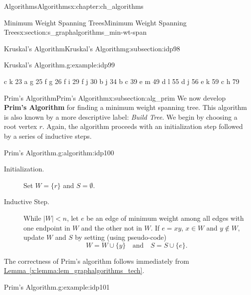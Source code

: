 \documentclass[oneside,10pt,]{book}
\newcommand{\xreffont}{\relax}
\newcommand{\terminology}[1]{\textbf{#1}}
\numberwithin{equation}{section}
\newcommand{\lt}{<}
\begin{document}
\begin{chapterptx}{Algorithms}{}{Algorithms}{}{}{x:chapter:ch_algorithms}
\begin{sectionptx}{Minimum Weight Spanning Trees}{}{Minimum Weight Spanning Trees}{}{}{x:section:s_graphalgorithms_min-wt-span}
\begin{subsectionptx}{Kruskal's Algorithm}{}{Kruskal's Algorithm}{}{}{g:subsection:idp98}
\begin{example}{Kruskal's Algorithm.}{g:example:idp99}
\begin{sidebyside}{2}{0.0125}{0.0125}{0.025}
\begin{sbspanel}{0.78}
\end{sbspanel}%
\begin{sbspanel}{0.17}%
\begin{preformatted}
c k 23
a g 25
f g 26
f i 29
f j 30
b j 34
b c 39
e m 49
d l 55
d j 56
e k 59
c h 79
\end{preformatted}
\end{sbspanel}%
\end{sidebyside}%
\end{example}
\end{subsectionptx}
%
%
\typeout{************************************************}
\typeout{************************************************}
%
\begin{subsectionptx}{Prim's Algorithm}{}{Prim's Algorithm}{}{}{x:subsection:alg_prim}
We now develop \terminology{Prim's Algorithm} for finding a minimum weight spanning tree. This algorithm is also known by a more descriptive label: \emph{Build Tree}. We begin by choosing a root vertex \(r\). Again, the algorithm proceeds with an initialization step followed by a series of inductive steps.%
\begin{algorithm}{Prim's Algorithm.}{}{g:algorithm:idp100}%
%
%
%
\begin{description}
\item[{Initialization.}]Set \(W=\{r\}\) and \(S=\emptyset\).%
\item[{Inductive Step.}]While \(|W| \lt n\), let \(e\) be an edge of minimum weight among all edges with one endpoint in \(W\) and the other not in \(W\).  If \(e=xy\), \(x\in W\) and \(y\not\in W\), update \(W\) and \(S\) by setting (using pseudo-code)%
\begin{equation*}
W = W\cup\{y\}\quad\text{and} \quad S = S\cup\{e\}.
\end{equation*}
%
\end{description}
%
\end{algorithm}
The correctness of Prim's algorithm follows immediately from \hyperref[x:lemma:lem_graphalgorithms_tech]{Lemma~{\xreffont\ref{x:lemma:lem_graphalgorithms_tech}}}.%
\begin{example}{Prim's Algorithm.}{g:example:idp101}%
\begin{sidebyside}{2}{0.0125}{0.0125}{0.025}%
\begin{sbspanel}{0.78}%

\end{sbspanel}
\end{sidebyside}
\end{example}
\end{subsectionptx}
\end{sectionptx}
\end{chapterptx}
\end{document}
